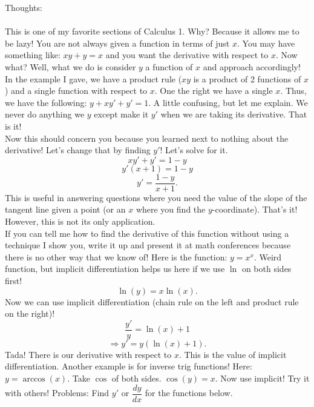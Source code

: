 \documentclass[10pt]{article}
\theoremstyle{Theorem}
\theoremstyle{definition}
\theoremstyle{remark}
\theoremstyle{custom}
\begin{document}
\thispagestyle{firststyle}
\pagestyle{plain}

Thoughts:\\\\
This is one of my favorite sections of Calculus 1. Why? Because it allows me to be lazy! You are not always given a function in terms of just $x$. You may have something like: $xy+y=x$ and you want the derivative with respect to $x$. Now what? Well, what we do is consider $y$ a function of $x$ and approach accordingly! In the example I gave, we have a product rule ($xy$ is a product of 2 functions of $x$) and a single function with respect to $x$. One the right we have a single $x$. Thus, we have the following: $y+xy'+y'=1$. A little confusing, but let me explain. We never do anything we $y$ except make it $y'$ when we are taking its derivative. That is it!\\
Now this should concern you because you learned next to nothing about the derivative! Let's change that by finding $y'$! Let's solve for it. 
\[
xy'+y'=1-y
\]
\[
y'(x+1)=1-y
\]
\[
y'=\dfrac{1-y}{x+1}.
\]
This is useful in answering questions where you need the value of the slope of the tangent line given a point (or an $x$ where you find the $y$-coordinate). That's it! However, this is not its only application.\\
If you can tell me how to find the derivative of this function without using a technique I show you, write it up and present it at math conferences because there is no other way that we know of! Here is the function: $y=x^x$. Weird function, but implicit differentiation helps us here if we use $\ln$ on both sides first!
\[
\ln(y)=x\ln(x).
\]
Now we can use implicit differentiation (chain rule on the left and product rule on the right)!
\[
\dfrac{y'}{y}=\ln(x)+1
\]
\[
\Rightarrow y'=y(\ln(x)+1).
\]
Tada! There is our derivative with respect to $x$. This is the value of implicit differentiation. Another example is for inverse trig functions! Here: $y=\arccos(x)$. Take $\cos$ of both sides. $\cos(y)=x$. Now use implicit! Try it with others!
\newpage
\noindent Problems: Find $y'$ or $\dfrac{dy}{dx}$ for the functions below.
\end{document}
